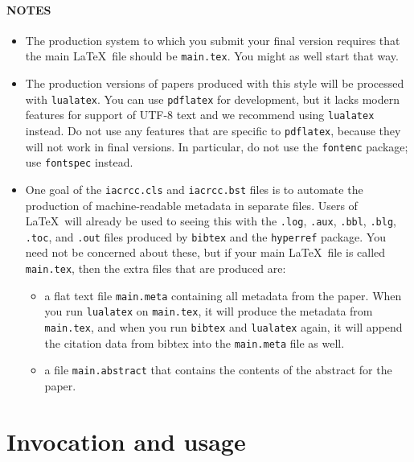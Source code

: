 \documentclass{iacrcc}
\begin{document}
\paragraph*{NOTES}
\begin{itemize}
\item The production system to which you submit your final version requires
  that the main \LaTeX\ file should be \texttt{main.tex}. You might as
  well start that way.
\item The production versions of papers produced with this style will
  be processed with \texttt{lualatex}.  You can use \texttt{pdflatex}
  for development, but it lacks modern features for support of UTF-8
  text and we recommend using \texttt{lualatex} instead.  Do not use
  any features that are specific to \texttt{pdflatex}, because they
  will not work in final versions. In particular, do not use the
  \texttt{fontenc} package; use \texttt{fontspec} instead.
\item One goal of the \texttt{iacrcc.cls} and \texttt{iacrcc.bst}
  files is to automate the production of machine-readable metadata in
  separate files. Users of \LaTeX\ will already be used to seeing this
  with the \texttt{.log}, \texttt{.aux}, \texttt{.bbl}, \texttt{.blg},
  \texttt{.toc}, and \texttt{.out} files produced by \texttt{bibtex}
  and the \texttt{hyperref} package.  You need not be concerned about
  these, but if your main \LaTeX\ file is called \texttt{main.tex},
  then the extra files that are produced are:
\begin{itemize}
\item a flat text file \texttt{main.meta} containing all metadata
  from the paper.  When you run \texttt{lualatex} on
  \texttt{main.tex}, it will produce the metadata from
  \texttt{main.tex}, and when you run \texttt{bibtex} and
  \texttt{lualatex} again, it will append the citation data from
  bibtex into the \texttt{main.meta} file as well.
\item a file \texttt{main.abstract} that contains
  the contents of the abstract for the paper.
\end{itemize}
\end{itemize}
\section{Invocation and usage}
\end{document}
